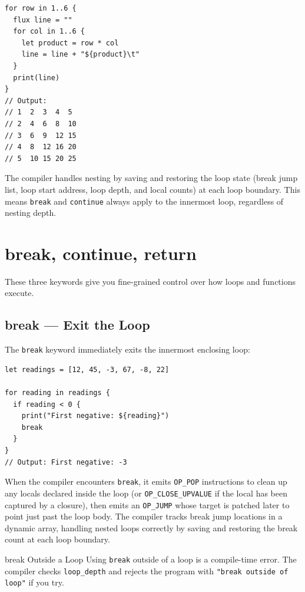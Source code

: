 \begin{lstlisting}[language=Lattice, caption={Nested loops for a multiplication table}]
for row in 1..6 {
  flux line = ""
  for col in 1..6 {
    let product = row * col
    line = line + "${product}\t"
  }
  print(line)
}
// Output:
// 1  2  3  4  5
// 2  4  6  8  10
// 3  6  9  12 15
// 4  8  12 16 20
// 5  10 15 20 25
\end{lstlisting}

The compiler handles nesting by saving and restoring the loop state (break jump list, loop start address, loop depth, and local counts) at each loop boundary. This means \lstinline|break| and \lstinline|continue| always apply to the innermost loop, regardless of nesting depth.

\section{break, continue, return}\label{sec:break-continue-return}

These three keywords give you fine-grained control over how loops and functions execute.

\subsection{break --- Exit the Loop}\label{sec:break}

The \lstinline|break| keyword immediately exits the innermost enclosing loop:

\begin{lstlisting}[language=Lattice, caption={Finding the first negative number}]
let readings = [12, 45, -3, 67, -8, 22]

for reading in readings {
  if reading < 0 {
    print("First negative: ${reading}")
    break
  }
}
// Output: First negative: -3
\end{lstlisting}

When the compiler encounters \lstinline|break|, it emits \lstinline|OP_POP| instructions to clean up any locals declared inside the loop (or \lstinline|OP_CLOSE_UPVALUE| if the local has been captured by a closure), then emits an \lstinline|OP_JUMP| whose target is patched later to point just past the loop body. The compiler tracks break jump locations in a dynamic array, handling nested loops correctly by saving and restoring the break count at each loop boundary.

\begin{warnbox}{break Outside a Loop}
Using \lstinline|break| outside of a loop is a compile-time error. The compiler checks \lstinline|loop_depth| and rejects the program with \texttt{"break outside of loop"} if you try.
\end{warnbox}

